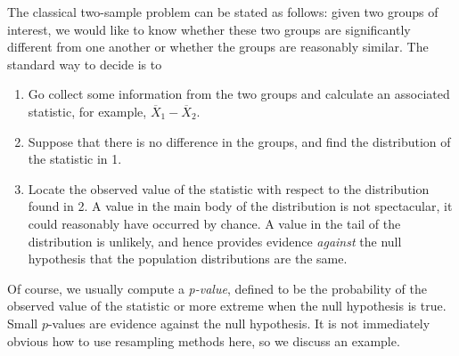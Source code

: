 \documentclass[captions=tableheading]{scrbook}
\begin{document}
\label{sec:Resampling-in-Hypothesis}

The classical two-sample problem can be stated as follows: given two groups of interest, we would like to know whether these two groups are significantly different from one another or whether the groups are reasonably similar. The standard way to decide is to 
\begin{enumerate}
\item Go collect some information from the two groups and calculate an associated statistic, for example, \(\overline{X}_{1}-\overline{X}_{2}\).
\item Suppose that there is no difference in the groups, and find the distribution of the statistic in 1.
\item Locate the observed value of the statistic with respect to the distribution found in 2. A value in the main body of the distribution is not spectacular, it could reasonably have occurred by chance. A value in the tail of the distribution is unlikely, and hence provides evidence \emph{against} the null hypothesis that the population distributions are the same.
\end{enumerate}

Of course, we usually compute a \emph{p-value}, defined to be the probability of the observed value of the statistic or more extreme when the null hypothesis is true. Small \(p\)-values are evidence against the null hypothesis. It is not immediately obvious how to use resampling methods here, so we discuss an example.
\end{document}
